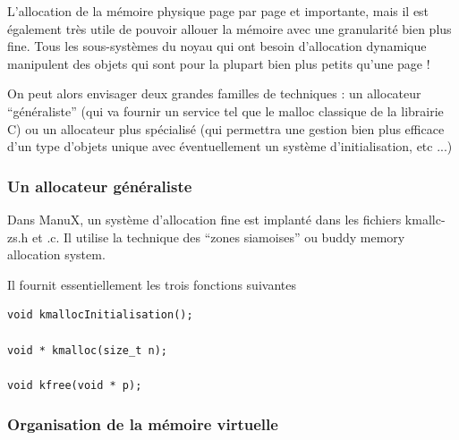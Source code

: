    L'allocation de la mémoire physique page par page et importante,
mais il est également très utile de pouvoir allouer la mémoire avec
une granularité bien plus fine. Tous les sous-systèmes du noyau qui
ont besoin d'allocation dynamique manipulent des objets qui sont pour
la plupart bien plus petits qu'une page !

   On peut alors envisager deux grandes familles de techniques : un
allocateur ``généraliste''  (qui va fournir un service tel que le
malloc classique de la librairie C) ou un allocateur plus spécialisé
(qui permettra une gestion bien plus efficace d'un type d'objets
unique avec éventuellement un système d'initialisation, etc ...)

%  
\subsubsection{Un allocateur généraliste}

   Dans ManuX, un système d'allocation fine est implanté dans les
fichiers kmallc-zs.h et .c. Il utilise la technique des ``zones
siamoises'' ou buddy memory allocation system.

   Il fournit essentiellement les trois fonctions suivantes

\begin{lstlisting}
void kmallocInitialisation();

void * kmalloc(size_t n);

void kfree(void * p);
\end{lstlisting}

\subsubsection{Organisation de la mémoire virtuelle}


